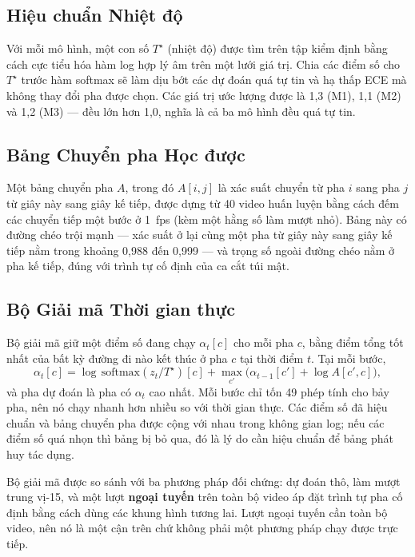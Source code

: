 \subsection{Hiệu chuẩn Nhiệt độ}

Với mỗi mô hình, một con số $T^\star$ (nhiệt độ) được tìm trên tập kiểm định bằng cách cực tiểu hóa hàm log hợp lý âm trên một lưới giá trị. Chia các điểm số cho $T^\star$ trước hàm softmax sẽ làm dịu bớt các dự đoán quá tự tin và hạ thấp ECE mà không thay đổi pha được chọn. Các giá trị ước lượng được là 1,3 (M1), 1,1 (M2) và 1,2 (M3) --- đều lớn hơn 1,0, nghĩa là cả ba mô hình đều quá tự tin.

\subsection{Bảng Chuyển pha Học được}

Một bảng chuyển pha $A$, trong đó $A[i, j]$ là xác suất chuyển từ pha $i$ sang pha $j$ từ giây này sang giây kế tiếp, được dựng từ 40 video huấn luyện bằng cách đếm các chuyển tiếp một bước ở 1~fps (kèm một hằng số làm mượt nhỏ). Bảng này có đường chéo trội mạnh --- xác suất ở lại cùng một pha từ giây này sang giây kế tiếp nằm trong khoảng 0,988 đến 0,999 --- và trọng số ngoài đường chéo nằm ở pha kế tiếp, đúng với trình tự cố định của ca cắt túi mật.

\subsection{Bộ Giải mã Thời gian thực}

Bộ giải mã giữ một điểm số đang chạy $\alpha_t[c]$ cho mỗi pha $c$, bằng điểm tổng tốt nhất của bất kỳ đường đi nào kết thúc ở pha $c$ tại thời điểm $t$. Tại mỗi bước,
\begin{equation}
\alpha_t[c] = \log\,\text{softmax}(z_t / T^\star)[c] + \max_{c'} \big( \alpha_{t-1}[c'] + \log A[c', c] \big),
\label{eq:vn_viterbi}
\end{equation}
và pha dự đoán là pha có $\alpha_t$ cao nhất. Mỗi bước chỉ tốn 49 phép tính cho bảy pha, nên nó chạy nhanh hơn nhiều so với thời gian thực. Các điểm số đã hiệu chuẩn và bảng chuyển pha được cộng với nhau trong không gian log; nếu các điểm số quá nhọn thì bảng bị bỏ qua, đó là lý do cần hiệu chuẩn để bảng phát huy tác dụng.

Bộ giải mã được so sánh với ba phương pháp đối chứng: dự đoán thô, làm mượt trung vị-15, và một lượt \textbf{ngoại tuyến} trên toàn bộ video áp đặt trình tự pha cố định bằng cách dùng các khung hình tương lai. Lượt ngoại tuyến cần toàn bộ video, nên nó là một cận trên chứ không phải một phương pháp chạy được trực tiếp.

